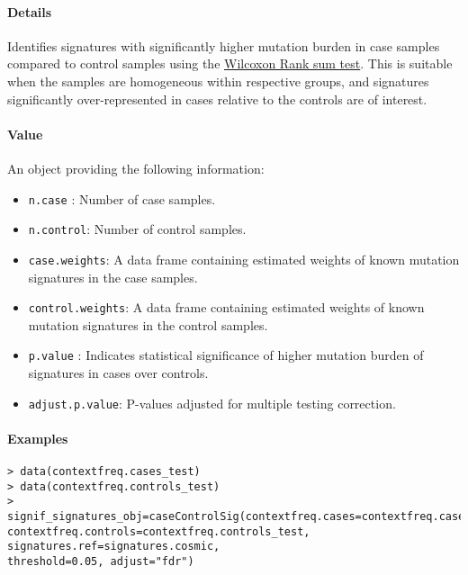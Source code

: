 \documentclass[]{article}
\providecommand{\tightlist}{%
  \setlength{\itemsep}{0pt}\setlength{\parskip}{0pt}}
\let\oldparagraph\paragraph
\renewcommand{\paragraph}[1]{\oldparagraph{#1}\mbox{}}
\begin{document}
\paragraph{\texorpdfstring{\textbf{Details}}{Details}}\label{details-9}

Identifies signatures with significantly higher mutation burden in case
samples compared to control samples using the
\href{https://www.rdocumentation.org/packages/stats/versions/3.5.2/topics/wilcox.test}{Wilcoxon
Rank sum test}. This is suitable when the samples are homogeneous within
respective groups, and signatures significantly over-represented in
cases relative to the controls are of interest.

\paragraph{\texorpdfstring{\textbf{Value}}{Value}}\label{value-11}

An object providing the following information:

\begin{itemize}
\tightlist
\item
  \texttt{n.case} : Number of case samples.
\item
  \texttt{n.control}: Number of control samples.
\item
  \texttt{case.weights}: A data frame containing estimated weights of
  known mutation signatures in the case samples.
\item
  \texttt{control.weights}: A data frame containing estimated weights of
  known mutation signatures in the control samples.
\item
  \texttt{p.value} : Indicates statistical significance of higher
  mutation burden of signatures in cases over controls.
\item
  \texttt{adjust.p.value}: P-values adjusted for multiple testing
  correction.
\end{itemize}

\paragraph{\texorpdfstring{\textbf{Examples}}{Examples}}\label{examples-13}

\begin{verbatim}
> data(contextfreq.cases_test)
> data(contextfreq.controls_test)
> signif_signatures_obj=caseControlSig(contextfreq.cases=contextfreq.cases_test, 
contextfreq.controls=contextfreq.controls_test, signatures.ref=signatures.cosmic, 
threshold=0.05, adjust="fdr")

\end{verbatim}



\printindex
\end{document}
